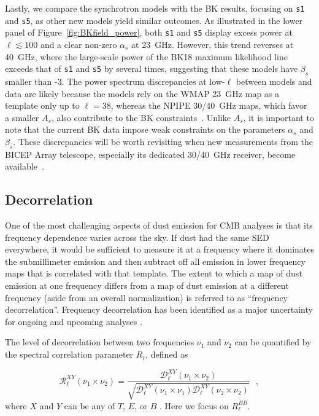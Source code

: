 \documentclass[twocolumn]{aastex631}
\begin{document}
Lastly, we compare the synchrotron models with the BK results, focusing on \texttt{s1} and \texttt{s5}, as other new models yield similar outcomes. As illustrated in the lower panel of Figure~\ref{fig:BKfield_power}, both \texttt{s1} and \texttt{s5} display excess power at $\ell \lesssim 100$ and a clear non-zero $\alpha_s$ at 23~GHz. However, this trend reverses at 40~GHz, where the large-scale power of the BK18 maximum likelihood line exceeds that of \texttt{s1} and \texttt{s5} by several times, suggesting that these models have $\beta_s$ smaller than -3. The power spectrum discrepancies at low-$\ell$ between models and data are likely because the models rely on the WMAP 23~GHz map as a template only up to $\ell = 38$, whereas the NPIPE 30/40~GHz maps, which favor a smaller $A_s$, also contribute to the BK constraints~\citep[][Figure~21]{Ade:2021}. Unlike $A_s$, it is important to note that the current BK data impose weak constraints on the parameters $\alpha_s$ and $\beta_s$. These discrepancies will be worth revisiting when new measurements from the BICEP Array telescope, especially its dedicated 30/40~GHz receiver, become available~\citep{Moncelsi:2020}.

\subsection{Decorrelation} \label{subsec:decorrelation}

One of the most challenging aspects of dust emission for CMB analyses is that its frequency dependence varies across the sky. If dust had the same SED everywhere, it would be sufficient to measure it at a frequency where it dominates the submillimeter emission and then subtract off all emission in lower frequency maps that is correlated with that template. The extent to which a map of dust emission at one frequency differs from a map of dust emission at a different frequency (aside from an overall normalization) is referred to as ``frequency decorrelation''. Frequency decorrelation has been identified as a major uncertainty for ongoing and upcoming analyses \citep{Ade:2021}.

The level of decorrelation between two frequencies $\nu_1$ and $\nu_2$ can be quantified by the spectral correlation parameter $R_\ell$, defined as

\begin{equation} \label{eq:R_ell}
    \mathcal{R}^{XY}_\ell(\nu_1\times\nu_2) = \frac{\mathcal{D}_\ell^{XY}(\nu_1\times\nu_2)}{\sqrt{\mathcal{D}_\ell^{XY}(\nu_1\times\nu_1)\mathcal{D}_\ell^{XY}(\nu_2\times\nu_2)}}
    ~~~,
\end{equation}
where $X$ and $Y$ can be any of $T$, $E$, or $B$ \citep{planck2016-L}. Here we focus on $R_\ell^{BB}$.
\end{document}
